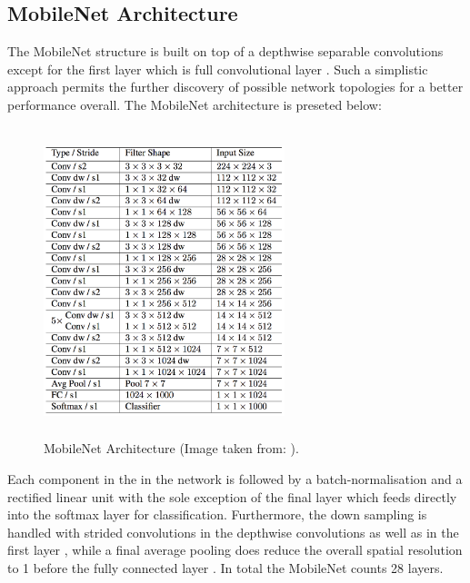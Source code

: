 \subsection{MobileNet Architecture}

The MobileNet structure is built on top of a depthwise separable convolutions except for the first layer which is full convolutional layer \cite{paper:MobileNets}. Such a simplistic approach permits the further discovery of possible network topologies for a better performance overall. The MobileNet architecture is preseted below:

\begin{figure}[!htbp]
\begin{center}
\includegraphics[width=7cm,height=9cm,keepaspectratio]{images/mobileNet_structure.png}
\end{center}
\caption{MobileNet Architecture (Image taken from: \cite{paper:MobileNets}).}
\end{figure}

Each component in the in the network is followed by a batch-normalisation and a rectified linear unit with the sole exception of the final layer which feeds directly into the softmax layer for classification\cite{paper:MobileNets}. Furthermore, the down sampling is handled with strided convolutions in the depthwise convolutions as well as in the first layer \cite{paper:MobileNets}, while a final average pooling does reduce the overall spatial resolution to 1 before the fully connected layer \cite{paper:MobileNets}. In total the MobileNet counts 28 layers.

